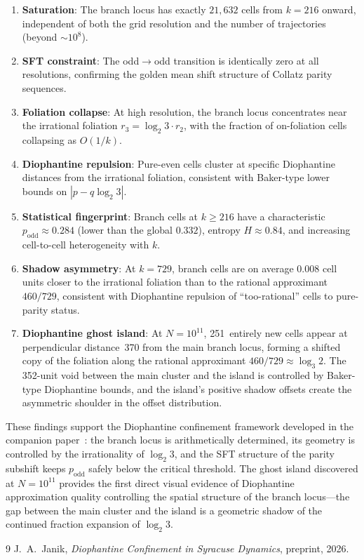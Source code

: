 \documentclass[11pt]{article}
\begin{document}
\begin{enumerate}
\item \textbf{Saturation}: The branch locus has exactly $21{,}632$
  cells from $k = 216$ onward, independent of both the grid
  resolution and the number of trajectories (beyond $\sim 10^8$).

\item \textbf{SFT constraint}: The odd$\to$odd transition is
  identically zero at all resolutions, confirming the golden mean
  shift structure of Collatz parity sequences.

\item \textbf{Foliation collapse}: At high resolution, the branch
  locus concentrates near the irrational foliation
  $r_3 = \log_2 3 \cdot r_2$, with the fraction of on-foliation
  cells collapsing as $O(1/k)$.

\item \textbf{Diophantine repulsion}: Pure-even cells cluster at
  specific Diophantine distances from the irrational foliation,
  consistent with Baker-type lower bounds on
  $|p - q\log_2 3|$.

\item \textbf{Statistical fingerprint}: Branch cells at $k \ge 216$
  have a characteristic $p_{\mathrm{odd}} \approx 0.284$ (lower
  than the global $0.332$), entropy $H \approx 0.84$, and
  increasing cell-to-cell heterogeneity with $k$.

\item \textbf{Shadow asymmetry}: At $k = 729$, branch cells are
  on average $0.008$ cell units closer to the irrational foliation
  than to the rational approximant $460/729$, consistent with
  Diophantine repulsion of ``too-rational'' cells to pure-parity
  status.

\item \textbf{Diophantine ghost island}: At $N = 10^{11}$,
  251~entirely new cells appear at perpendicular distance~370 from
  the main branch locus, forming a shifted copy of the foliation
  along the rational approximant $460/729 \approx \log_3 2$.  The
  352-unit void between the main cluster and the island is
  controlled by Baker-type Diophantine bounds, and the island's
  positive shadow offsets create the asymmetric shoulder in the
  offset distribution.
\end{enumerate}

These findings support the Diophantine confinement framework
developed in the companion paper~\cite{Janik2026}: the branch locus
is arithmetically determined, its geometry is controlled by the
irrationality of $\log_2 3$, and the SFT structure of the parity
subshift keeps $p_{\mathrm{odd}}$ safely below the critical
threshold.  The ghost island discovered at $N = 10^{11}$ provides
the first direct visual evidence of Diophantine approximation
quality controlling the spatial structure of the branch locus---the
gap between the main cluster and the island is a geometric shadow
of the continued fraction expansion of $\log_2 3$.

\begin{thebibliography}{9}
J.~A.~Janik, \emph{Diophantine Confinement in Syracuse Dynamics},
  preprint, 2026.
\end{thebibliography}
\end{document}
